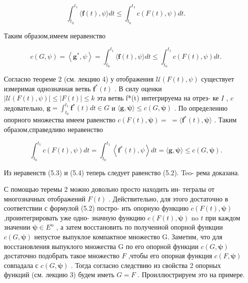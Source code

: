 \documentclass[8pt]{extarticle}
\begin{document}
\[
{\int }_{{t}_{0}}^{{t}_{1}}\langle \mathbf{f}\left( t\right) ,\psi \rangle {dt} \leq  {\int }_{{t}_{0}}^{{t}_{1}}c\left( {F\left( t\right) ,\psi }\right) {dt}.
\]

Таким образом,имеем неравенство

\[
c\left( {G,\psi }\right)  = \left\langle  {{\mathbf{g}}^{ * },\psi }\right\rangle   = {\int }_{{t}_{0}}^{{t}_{1}}\langle \mathbf{f}\left( t\right) ,\psi \rangle {dt} \leq  {\int }_{{t}_{0}}^{{t}_{1}}c\left( {F\left( t\right) ,\psi }\right) {dt}. \tag{5.3}
\]

Согласно теореме 2 (см. лекцию 4) у отображения \(\mathcal{U}\left( {F\left( t\right) ,\psi }\right)\) существует измеримая однозначная ветвь \({\mathbf{f}}^{ * }\left( t\right)\) . В силу оценки \(\left| {\mathcal{U}\left( {F\left( t\right) ,\psi }\right) }\right|  \leq  \left| {F\left( t\right) }\right|  \leq  k\) эта ветвь f*(t) интегрируема на отрез- ке \(I\) , \(c\) ледовательно, \(\mathbf{g} = {\int }_{{t}_{0}}^{{t}_{1}}{\mathbf{f}}^{ * }\left( t\right) {dt} \in  G\) и \(\langle \mathbf{g},\mathbf{\psi }\rangle  \leq  c\left( {G,\mathbf{\psi }}\right)\) . По определению опорного множества имеем равенство \(c\left( {F\left( t\right) ,\mathbf{\psi }}\right)  = \; = \langle {\mathbf{f}}^{ * }\left( t\right) ,\mathbf{\psi }\rangle\) . Таким образом,справедливо неравенство

\[
{\int }_{{t}_{0}}^{{t}_{1}}c\left( {F\left( t\right) ,\psi }\right) {dt} = {\int }_{{t}_{0}}^{{t}_{1}}\left\langle  {{\mathbf{f}}^{ * }\left( t\right) ,\psi }\right\rangle  {dt} = \langle \mathbf{g},\mathbf{\psi }\rangle  \leq  c\left( {G,\mathbf{\psi }}\right) . \tag{5.4}
\]

Из неравенств (5.3) и (5.4) теперь следует равенство (5.2). Teo- рема доказана.

С помощью теремы 2 можно довольно просто находить ин- тегралы от многозначных отображений \(F\left( t\right)\) . Действительно, для этого достаточно в соответствии с формулой (5.2) постро- ить опорную функцию \(c\left( {F\left( t\right) ,\mathbf{\psi }}\right)\) ,проинтегрировать уже одно- значную функцию \(c\left( {F\left( t\right) ,\mathbf{\psi }}\right)\) no \(t\) при каждом значении \(\mathbf{\psi } \in  {E}^{n}\) , а затем восстановить по полученной опорной функции \(c\left( {G,\mathbf{\psi }}\right)\) непустое выпуклое компактное множество G. Заметим, что для восстановления выпуклого множества G по его опорной функции \(c\left( {G,\mathbf{\psi }}\right)\) достаточно подобрать такое множество \(F\) ,чтобы его опорная функция \(c\left( {F,\mathbf{\psi }}\right)\) совпадала с \(c\left( {G,\mathbf{\psi }}\right)\) . Тогда согласно следствию из свойства 2 опорных функций (см. лекцию 3) будем иметь \(G = F\) . Проиллюстрируем это на примере.
\end{document}
